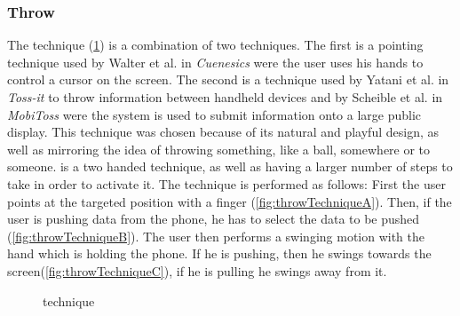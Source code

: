 \subsubsection{Throw} \label{sec:throwTechnique}
The \throw technique (\cref{fig:throwTechnique}) is a combination of two techniques.
The first is a pointing technique used by Walter et al. in \emph{Cuenesics} \cite{Walter:2014} were the user uses his hands to control a cursor on the screen.
The second is a technique used by Yatani et al. \cite{Yatani:2005} in \emph{Toss-it} to throw information between handheld devices and by Scheible et al. in \emph{MobiToss} \cite{Scheible:2008} were the system is used to submit information onto a large public display.
This technique was chosen because of its natural and playful design, as well as mirroring the idea of throwing something, like a ball, somewhere or to someone.
\throw is a two handed technique, as well as having a larger number of steps to take in order to activate it.
The \throw technique is performed as follows: 
First the user points at the targeted position with a finger (\cref{fig:throwTechniqueA}).
Then, if the user is pushing data from the phone, he has to select the data to be pushed (\cref{fig:throwTechniqueB}).
The user then performs a swinging motion with the hand which is holding the phone.
If he is pushing, then he swings towards the screen(\cref{fig:throwTechniqueC}), if he is pulling he swings away from it. 


\begin{figure}[H]
	\caption{\push \throw technique}
	\label{fig:throwTechnique}
\end{figure}

